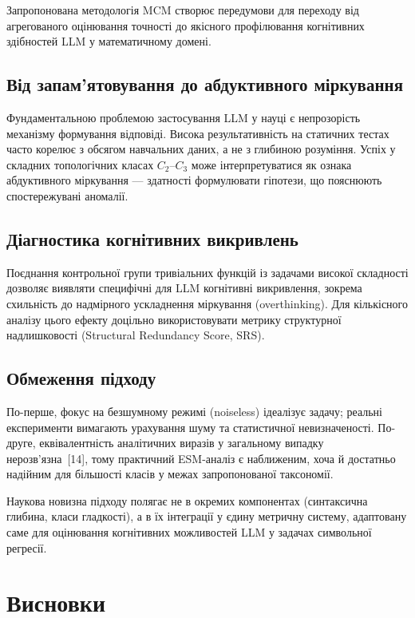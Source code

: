 \documentclass[11pt]{article}
\begin{document}
Запропонована методологія MCM створює передумови для переходу від агрегованого оцінювання точності до якісного профілювання когнітивних здібностей LLM у математичному домені.

\subsection{Від запам'ятовування до абдуктивного міркування}

Фундаментальною проблемою застосування LLM у науці є непрозорість механізму формування відповіді. Висока результативність на статичних тестах часто корелює з обсягом навчальних даних, а не з глибиною розуміння. Успіх у складних топологічних класах $C_2$--$C_3$ може інтерпретуватися як ознака абдуктивного міркування --- здатності формулювати гіпотези, що пояснюють спостережувані аномалії.

\subsection{Діагностика когнітивних викривлень}

Поєднання контрольної групи тривіальних функцій із задачами високої складності дозволяє виявляти специфічні для LLM когнітивні викривлення, зокрема схильність до надмірного ускладнення міркування (overthinking). Для кількісного аналізу цього ефекту доцільно використовувати метрику структурної надлишковості (Structural Redundancy Score, SRS).

\subsection{Обмеження підходу}

По-перше, фокус на безшумному режимі (noiseless) ідеалізує задачу; реальні експерименти вимагають урахування шуму та статистичної невизначеності. По-друге, еквівалентність аналітичних виразів у загальному випадку нерозв'язна~[14], тому практичний ESM-аналіз є наближеним, хоча й достатньо надійним для більшості класів у межах запропонованої таксономії.

Наукова новизна підходу полягає не в окремих компонентах (синтаксична глибина, класи гладкості), а в їх інтеграції у єдину метричну систему, адаптовану саме для оцінювання когнітивних можливостей LLM у задачах символьної регресії.

\section*{Висновки}
\end{document}
